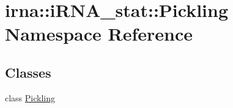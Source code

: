 \hypertarget{namespaceirna_1_1iRNA__stat_1_1Pickling}{
\section{irna\-:\-:i\-R\-N\-A\-\_\-stat\-:\-:\-Pickling \-Namespace \-Reference}
\label{namespaceirna_1_1iRNA__stat_1_1Pickling}
}
\subsection*{\-Classes}
\begin{DoxyCompactItemize}
\item 
class \hyperlink{classirna_1_1iRNA__stat_1_1Pickling_1_1Pickling}{\-Pickling}
\end{DoxyCompactItemize}
